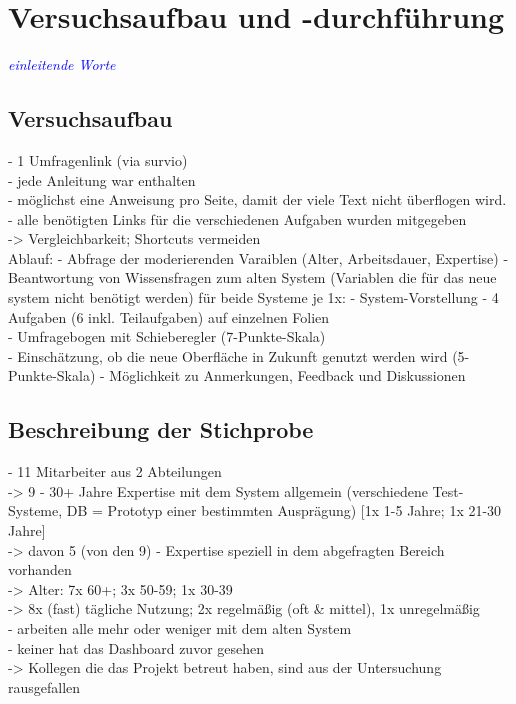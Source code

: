 \section{Versuchsaufbau und -durchführung}
\textcolor{blue}{\textit{einleitende Worte}}\\

\subsection{Versuchsaufbau}
- 1 Umfragenlink (via survio)\\
- jede Anleitung war enthalten\\
- möglichst eine Anweisung pro Seite, damit der viele Text nicht überflogen wird.\\
- alle benötigten Links für die verschiedenen Aufgaben wurden mitgegeben\\
-> Vergleichbarkeit; Shortcuts vermeiden\\
Ablauf:
- Abfrage der moderierenden Varaiblen (Alter, Arbeitsdauer, Expertise)
- Beantwortung von Wissensfragen zum alten System (Variablen die für das neue system nicht benötigt werden)
für beide Systeme je 1x:
    - System-Vorstellung
    - 4 Aufgaben (6 inkl. Teilaufgaben) auf einzelnen Folien\\
    - Umfragebogen mit Schieberegler (7-Punkte-Skala)\\
- Einschätzung, ob die neue Oberfläche in Zukunft genutzt werden wird (5-Punkte-Skala)
- Möglichkeit zu Anmerkungen, Feedback und Diskussionen

\subsection{Beschreibung der Stichprobe}
- 11 Mitarbeiter aus 2 Abteilungen\\
-> 9 - 30+ Jahre Expertise mit dem System allgemein (verschiedene Test-Systeme, DB = Prototyp einer bestimmten Ausprägung) [1x 1-5 Jahre; 1x 21-30 Jahre]\\
-> davon 5 (von den 9) - Expertise speziell in dem abgefragten Bereich vorhanden\\
-> Alter: 7x 60+; 3x 50-59; 1x 30-39\\
-> 8x (fast) tägliche Nutzung; 2x regelmäßig (oft \& mittel), 1x unregelmäßig\\
- arbeiten alle mehr oder weniger mit dem alten System\\
- keiner hat das Dashboard zuvor gesehen\\
-> Kollegen die das Projekt betreut haben, sind aus der Untersuchung rausgefallen\\

